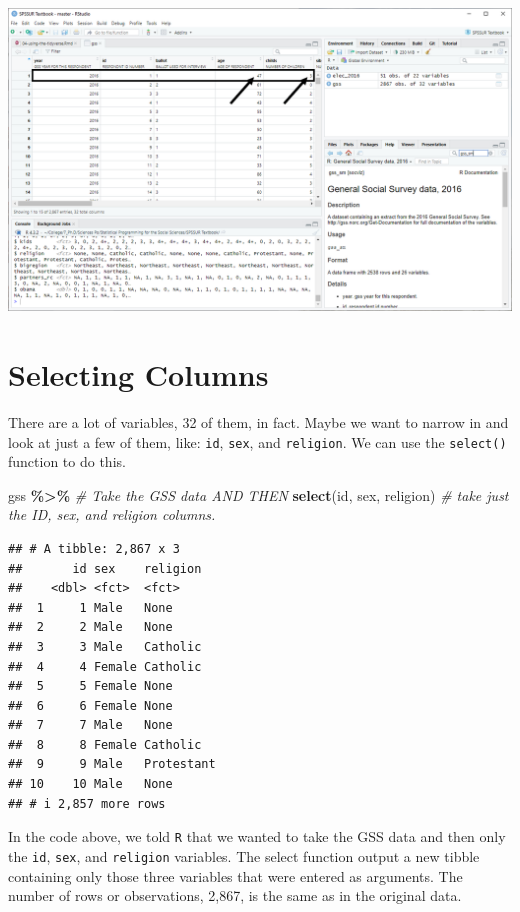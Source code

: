 \documentclass[
]{book}
\newenvironment{Shaded}{\begin{snugshade}}{\end{snugshade}}
\newcommand{\CommentTok}[1]{\textcolor[rgb]{0.56,0.35,0.01}{\textit{#1}}}
\newcommand{\FunctionTok}[1]{\textcolor[rgb]{0.13,0.29,0.53}{\textbf{#1}}}
\newcommand{\NormalTok}[1]{#1}
\newcommand{\SpecialCharTok}[1]{\textcolor[rgb]{0.81,0.36,0.00}{\textbf{#1}}}
\begin{document}
\includegraphics{docs/_main_files/figure-html/GSS_Respondent-1.png}

\hypertarget{selecting-columns}{%
\section{Selecting Columns}\label{selecting-columns}}

There are a lot of variables, 32 of them, in fact. Maybe we want to narrow in and look at just a few of them, like: \texttt{id}, \texttt{sex}, and \texttt{religion}. We can use the \texttt{select()} function to do this.

\begin{Shaded}
\begin{Highlighting}[]
\NormalTok{gss }\SpecialCharTok{\%\textgreater{}\%}                             \CommentTok{\# Take the GSS data AND THEN}
  \FunctionTok{select}\NormalTok{(id, sex, religion)         }\CommentTok{\# take just the ID, sex, and religion columns.}
\end{Highlighting}
\end{Shaded}

\begin{verbatim}
## # A tibble: 2,867 x 3
##       id sex    religion  
##    <dbl> <fct>  <fct>     
##  1     1 Male   None      
##  2     2 Male   None      
##  3     3 Male   Catholic  
##  4     4 Female Catholic  
##  5     5 Female None      
##  6     6 Female None      
##  7     7 Male   None      
##  8     8 Female Catholic  
##  9     9 Male   Protestant
## 10    10 Male   None      
## # i 2,857 more rows
\end{verbatim}

In the code above, we told \texttt{R} that we wanted to take the GSS data and then only the \texttt{id}, \texttt{sex}, and \texttt{religion} variables. The select function output a new tibble containing only those three variables that were entered as arguments. The number of rows or observations, 2,867, is the same as in the original data.
\end{document}
